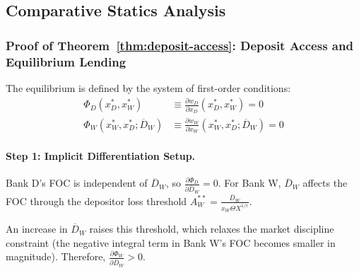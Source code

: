 \documentclass[12pt]{article}
\begin{document}
\subsection{Comparative Statics Analysis}

\subsubsection{Proof of Theorem~\ref{thm:deposit-access}: Deposit Access and Equilibrium Lending}
\label{app:proof-theorem7-1}
The equilibrium is defined by the system of first-order conditions:
\begin{align*}
\Phi_{D}(x_{D}^{*},x_{W}^{*}) &\equiv \frac{\partial w_{D}}{\partial x_{D}}(x_{D}^{*},x_{W}^{*}) = 0 \\
\Phi_{W}(x_{W}^{*},x_{D}^{*};\overline{D}_{W}) &\equiv \frac{\partial w_{W}}{\partial x_{W}}(x_{W}^{*},x_{D}^{*};\overline{D}_{W}) = 0
\end{align*}
\paragraph{Step 1: Implicit Differentiation Setup.}
Bank D's FOC is independent of $\overline{D}_{W}$, so $\frac{\partial\Phi_{D}}{\partial\overline{D}_{W}} = 0$. For Bank W, $\overline{D}_{W}$ affects the FOC through the depositor loss threshold $A_{W}^{**} = \frac{\overline{D}_{W}}{x_{W}\Theta X^{1/\epsilon}}$. 

An increase in $\overline{D}_{W}$ raises this threshold, which relaxes the market discipline constraint (the negative integral term in Bank W's FOC becomes smaller in magnitude). Therefore, $\frac{\partial\Phi_{W}}{\partial\overline{D}_{W}} > 0$.
\end{document}
